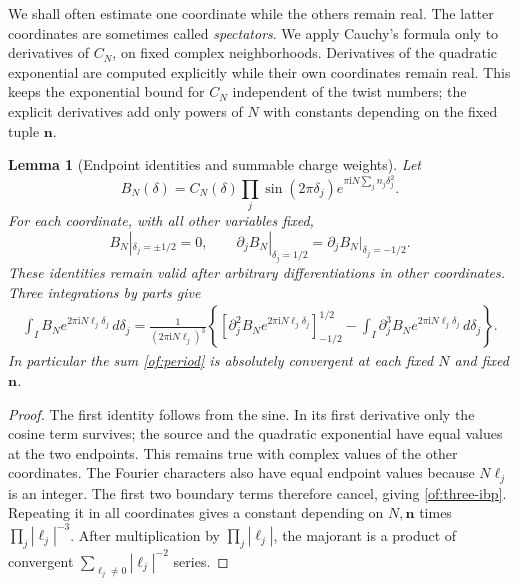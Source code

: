 \documentclass[11pt]{article}
\numberwithin{equation}{section}
\newtheorem{lemma}[theorem]{Lemma}
\theoremstyle{definition}\newtheorem{definition}[theorem]{Definition}
\theoremstyle{remark}\newtheorem{remark}[theorem]{Remark}
\newcommand{\ii}{\mathrm i}
\begin{document}
We shall often estimate one coordinate while the others remain real.
The latter coordinates are sometimes called \emph{spectators}. We
apply Cauchy's formula only to derivatives of $C_N$, on fixed complex
neighborhoods. Derivatives of the quadratic exponential are computed
explicitly while their own coordinates remain real. This keeps the
exponential bound for $C_N$ independent of the twist numbers; the
explicit derivatives add only powers of $N$ with constants depending
on the fixed tuple $\boldsymbol n$.

\begin{lemma}[Endpoint identities and summable charge weights]
\label{of:endpoints}
Let
\[
 B_N(\delta)=C_N(\delta)\prod_j\sin(2\pi\delta_j)
                         e^{\pi\ii N\sum_j n_j\delta_j^2}.
\]
For each coordinate, with all other variables fixed,
\begin{equation}\label{of:endpoint-identities}
 B_N|_{\delta_j=\pm1/2}=0,\qquad
 \partial_jB_N|_{\delta_j=1/2}=\partial_jB_N|_{\delta_j=-1/2}.
\end{equation}
These identities remain valid after arbitrary differentiations in
other coordinates. Three integrations by parts give
\begin{equation}\label{of:three-ibp}
\begin{split}
 \int_I B_N e^{2\pi\ii N\ell_j\delta_j}\,d\delta_j
 =\frac1{(2\pi\ii N\ell_j)^3}
 \left\{[\partial_j^2B_N e^{2\pi\ii N\ell_j\delta_j}]_{-1/2}^{1/2}
       -\int_I\partial_j^3B_N e^{2\pi\ii N\ell_j\delta_j}\,d\delta_j\right\}.
\end{split}
\end{equation}
In particular the sum \eqref{of:period} is absolutely convergent at
each fixed $N$ and fixed $\boldsymbol n$.
\end{lemma}
\begin{proof}
The first identity follows from the sine. In its first derivative
only the cosine term survives; the source and the quadratic exponential have equal
values at the two endpoints. This remains true with complex values
of the other coordinates. The Fourier characters also have equal
endpoint values because $N\ell_j$ is an integer. The first two
boundary terms therefore cancel, giving \eqref{of:three-ibp}.
Repeating it in all coordinates gives a constant depending on
$N,\boldsymbol n$ times $\prod_j|\ell_j|^{-3}$. After multiplication
by $\prod_j|\ell_j|$, the majorant is a product of convergent
$\sum_{\ell_j\ne0}|\ell_j|^{-2}$ series.
\end{proof}
\end{document}
